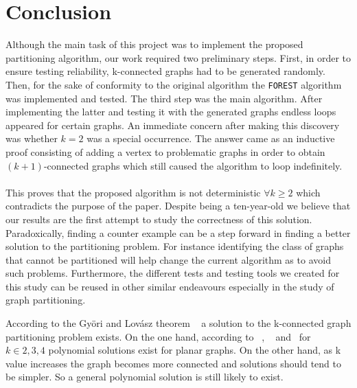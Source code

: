 \section{Conclusion}

Although the main task of this project was to implement the proposed partitioning algorithm, our work required two preliminary steps. First, in order to ensure testing reliability, k-connected graphs had to be generated randomly. Then, for the sake of conformity to the original algorithm the \verb!FOREST! algorithm was implemented and tested. The third step was the main algorithm. After implementing the latter and testing it with the generated graphs endless loops appeared for certain graphs. An immediate concern after making this discovery was whether $k=2$ was a special occurrence. The answer came as an inductive proof consisting of adding a vertex to problematic graphs in order to obtain $(k+1)$-connected graphs which still caused the algorithm to loop indefinitely. 

\paragraph{}

This proves that the proposed algorithm is not deterministic $\forall k \geq 2$ which contradicts the purpose of the paper. Despite being a ten-year-old we believe that our results are the first attempt to study the correctness of this solution. Paradoxically, finding a counter example can be a step forward in finding a better solution to the partitioning problem. For instance identifying the class of graphs that cannot be partitioned will help change the current algorithm as to avoid such problems. Furthermore, the different tests and testing tools we created for this study can be reused in other similar endeavours especially in the study of graph partitioning.

\pragraph{}

According to the Györi and Lovász theorem ~\cite{GE78} a solution to the k-connected graph partitioning problem exists. On the one hand, according to ~\cite{JS94}, ~\cite{GE78,LL77} and ~\cite{Nakano1997315}for $k \in {2, 3, 4}$ polynomial solutions exist for planar graphs. On the other hand, as k value increases the graph becomes more connected and solutions should tend to be simpler. So a general polynomial solution is still likely to exist. 

